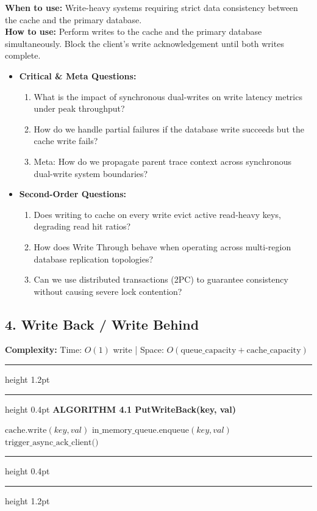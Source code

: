 \documentclass[11pt,a4paper]{article}
\newenvironment{textbookalgo}[2]{%
  \par\addvspace{1.2em}\noindent
  \hrule height 1.2pt
  \vspace{1.5pt}
  \hrule height 0.4pt
  \vspace{5pt}
  {\noindent\large\bfseries\sffamily ALGORITHM #1 \quad #2}
  \par\vspace{5pt}
  \RestyleAlgo{plain}
}{%
  \par\vspace{4pt}
  \hrule height 0.4pt
  \vspace{1.5pt}
  \hrule height 1.2pt
  \par\addvspace{1.2em}
}
\theoremstyle{definition}
\begin{document}
\noindent
\textbf{When to use:} Write-heavy systems requiring strict data consistency between the cache and the primary database.\\
\textbf{How to use:} Perform writes to the cache and the primary database simultaneously. Block the client's write acknowledgement until both writes complete.
\begin{itemize}[leftmargin=*]
  \item[] \textbf{Critical \& Meta Questions:}
  \begin{enumerate}
  \item What is the impact of synchronous dual-writes on write latency metrics under peak throughput?
  \item How do we handle partial failures if the database write succeeds but the cache write fails?
  \item Meta: How do we propagate parent trace context across synchronous dual-write system boundaries?
  \end{enumerate}
  \item[] \textbf{Second-Order Questions:}
  \begin{enumerate}
  \item Does writing to cache on every write evict active read-heavy keys, degrading read hit ratios?
  \item How does Write Through behave when operating across multi-region database replication topologies?
  \item Can we use distributed transactions (2PC) to guarantee consistency without causing severe lock contention?
  \end{enumerate}
\end{itemize}
\medskip

\clearpage
\subsection{4. Write Back / Write Behind}

\noindent
\textbf{Complexity:} Time: $O(1)$ write | Space: $O(\text{queue\_capacity} + \text{cache\_capacity})$
\smallskip

\begin{textbookalgo}{4.1}{PutWriteBack(key, val)}
\begin{algorithm}[H]
$\text{cache.write}(key, val)$\;
$\text{in\_memory\_queue.enqueue}(key, val)$\;
$\text{trigger\_async\_ack\_client()}$\;
\end{algorithm}
\end{textbookalgo}
\end{document}
